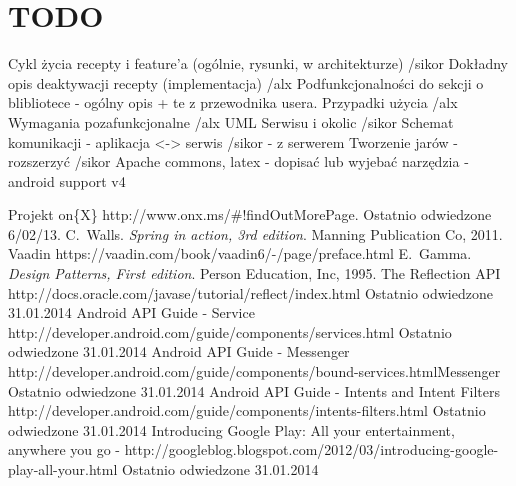 \documentclass[11pt,a4paper,polish,thesis]{dcsbook}
\begin{document}
\appendix

\section{TODO}
Cykl życia recepty i feature'a (ogólnie, rysunki, w architekturze) /sikor
Dokładny opis deaktywacji recepty (implementacja) /alx
Podfunkcjonalności do sekcji o blibliotece - ogólny opis + te z przewodnika usera. 
Przypadki użycia /alx
Wymagania pozafunkcjonalne /alx
UML Serwisu i okolic /sikor
Schemat komunikacji 
- aplikacja <-> serwis /sikor
- z serwerem 
Tworzenie jarów - rozszerzyć /sikor
Apache commons, latex - dopisać lub wyjebać
narzędzia - android support v4



\backmatter

\begin{thebibliography}{1}
Projekt on\{X\} http://www.onx.ms/\#!findOutMorePage. Ostatnio odwiedzone 6/02/13.
C.~Walls. \emph{Spring in action, 3rd edition}. Manning Publication Co, 2011.
Vaadin https://vaadin.com/book/vaadin6/-/page/preface.html 
E.~Gamma. \emph{Design Patterns, First edition}. Person Education, Inc, 1995.
The Reflection API  http://docs.oracle.com/javase/tutorial/reflect/index.html Ostatnio odwiedzone 31.01.2014
 Android API Guide - Service http://developer.android.com/guide/components/services.html Ostatnio odwiedzone 31.01.2014
 Android API Guide - Messenger http://developer.android.com/guide/components/bound-services.htmlMessenger  Ostatnio odwiedzone 31.01.2014 
 Android API Guide - Intents and Intent Filters http://developer.android.com/guide/components/intents-filters.html Ostatnio odwiedzone 31.01.2014 
Introducing Google Play: All your entertainment, anywhere you go - http://googleblog.blogspot.com/2012/03/introducing-google-play-all-your.html Ostatnio odwiedzone 31.01.2014
\end{thebibliography}
\end{document}
